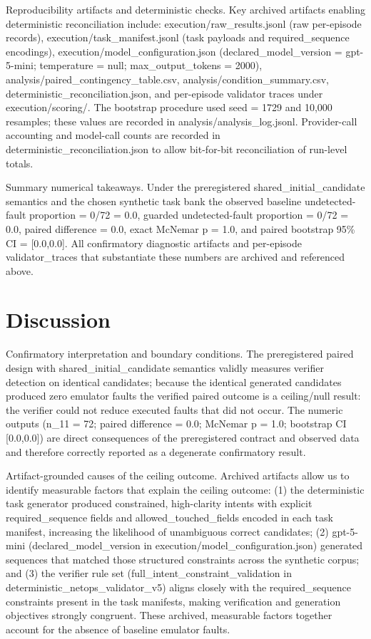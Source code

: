\documentclass[conference]{IEEEtran}
\begin{document}
Reproducibility artifacts and deterministic checks. Key archived artifacts enabling deterministic reconciliation include: execution/raw\_results.jsonl (raw per-episode records), execution/task\_manifest.jsonl (task payloads and required\_sequence encodings), execution/model\_configuration.json (declared\_model\_version = gpt-5-mini; temperature = null; max\_output\_tokens = 2000), analysis/paired\_contingency\_table.csv, analysis/condition\_summary.csv, deterministic\_reconciliation.json, and per-episode validator traces under execution/scoring/. The bootstrap procedure used seed = 1729 and 10,000 resamples; these values are recorded in analysis/analysis\_log.jsonl. Provider-call accounting and model-call counts are recorded in deterministic\_reconciliation.json to allow bit-for-bit reconciliation of run-level totals.

Summary numerical takeaways. Under the preregistered shared\_initial\_candidate semantics and the chosen synthetic task bank the observed baseline undetected-fault proportion = 0/72 = 0.0, guarded undetected-fault proportion = 0/72 = 0.0, paired difference = 0.0, exact McNemar p = 1.0, and paired bootstrap 95\% CI = [0.0,0.0]. All confirmatory diagnostic artifacts and per-episode validator\_traces that substantiate these numbers are archived and referenced above.

\section{Discussion}
Confirmatory interpretation and boundary conditions. The preregistered paired design with shared\_initial\_candidate semantics validly measures verifier detection on identical candidates; because the identical generated candidates produced zero emulator faults the verified paired outcome is a ceiling/null result: the verifier could not reduce executed faults that did not occur. The numeric outputs (n\_11 = 72; paired difference = 0.0; McNemar p = 1.0; bootstrap CI [0.0,0.0]) are direct consequences of the preregistered contract and observed data and therefore correctly reported as a degenerate confirmatory result.

Artifact-grounded causes of the ceiling outcome. Archived artifacts allow us to identify measurable factors that explain the ceiling outcome: (1) the deterministic task generator produced constrained, high-clarity intents with explicit required\_sequence fields and allowed\_touched\_fields encoded in each task manifest, increasing the likelihood of unambiguous correct candidates; (2) gpt-5-mini (declared\_model\_version in execution/model\_configuration.json) generated sequences that matched those structured constraints across the synthetic corpus; and (3) the verifier rule set (full\_intent\_constraint\_validation in deterministic\_netops\_validator\_v5) aligns closely with the required\_sequence constraints present in the task manifests, making verification and generation objectives strongly congruent. These archived, measurable factors together account for the absence of baseline emulator faults.
\end{document}
